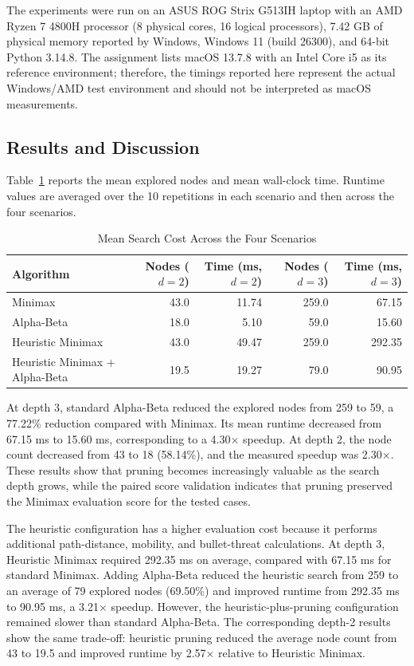 The experiments were run on an ASUS ROG Strix G513IH laptop with an AMD Ryzen 7 4800H processor (8 physical cores, 16 logical processors), 7.42 GB of physical memory reported by Windows, Windows 11 (build 26300), and 64-bit Python 3.14.8. The assignment lists macOS 13.7.8 with an Intel Core i5 as its reference environment; therefore, the timings reported here represent the actual Windows/AMD test environment and should not be interpreted as macOS measurements.

\subsection{Results and Discussion}
Table~\ref{tab:task2-performance} reports the mean explored nodes and mean wall-clock time. Runtime values are averaged over the 10 repetitions in each scenario and then across the four scenarios.

\begin{table}[!t]
\centering
\caption{Mean Search Cost Across the Four Scenarios}
\label{tab:task2-performance}
\scriptsize
\setlength{\tabcolsep}{7pt}
\begin{tabular}{lrrrr}
\hline
\textbf{Algorithm} & \textbf{Nodes ($d=2$)} & \textbf{Time (ms, $d=2$)} & \textbf{Nodes ($d=3$)} & \textbf{Time (ms, $d=3$)} \\
\hline
Minimax & 43.0 & 11.74 & 259.0 & 67.15 \\
Alpha-Beta & 18.0 & 5.10 & 59.0 & 15.60 \\
Heuristic Minimax & 43.0 & 49.47 & 259.0 & 292.35 \\
Heuristic Minimax + Alpha-Beta & 19.5 & 19.27 & 79.0 & 90.95 \\
\hline
\end{tabular}
\end{table}

At depth 3, standard Alpha-Beta reduced the explored nodes from 259 to 59, a 77.22\% reduction compared with Minimax. Its mean runtime decreased from 67.15 ms to 15.60 ms, corresponding to a 4.30$\times$ speedup. At depth 2, the node count decreased from 43 to 18 (58.14\%), and the measured speedup was 2.30$\times$. These results show that pruning becomes increasingly valuable as the search depth grows, while the paired score validation indicates that pruning preserved the Minimax evaluation score for the tested cases.

The heuristic configuration has a higher evaluation cost because it performs additional path-distance, mobility, and bullet-threat calculations. At depth 3, Heuristic Minimax required 292.35 ms on average, compared with 67.15 ms for standard Minimax. Adding Alpha-Beta reduced the heuristic search from 259 to an average of 79 explored nodes (69.50\%) and improved runtime from 292.35 ms to 90.95 ms, a 3.21$\times$ speedup. However, the heuristic-plus-pruning configuration remained slower than standard Alpha-Beta. The corresponding depth-2 results show the same trade-off: heuristic pruning reduced the average node count from 43 to 19.5 and improved runtime by 2.57$\times$ relative to Heuristic Minimax.

